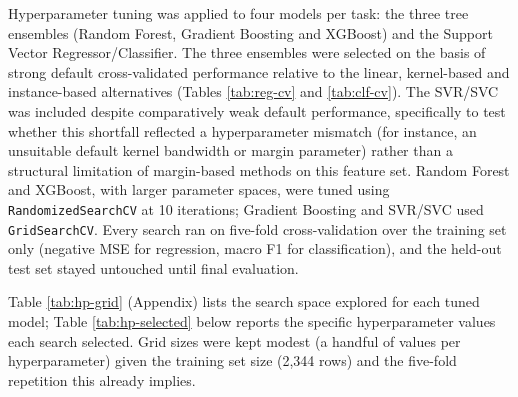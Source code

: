 \documentclass[11pt,a4paper]{article}
\begin{document}
Hyperparameter tuning was applied to four models per task: the three
tree ensembles (Random Forest, Gradient Boosting and XGBoost) and the
Support Vector Regressor/Classifier. The three ensembles were selected
on the basis of strong default cross-validated performance relative to
the linear, kernel-based and instance-based alternatives (Tables
\ref{tab:reg-cv} and \ref{tab:clf-cv}). The SVR/SVC was included despite
comparatively weak default performance, specifically to test whether
this shortfall reflected a hyperparameter mismatch (for instance, an
unsuitable default kernel bandwidth or margin parameter) rather than a
structural limitation of margin-based methods on this feature set.
Random Forest and XGBoost, with larger parameter spaces, were tuned
using \texttt{RandomizedSearchCV} at 10 iterations; Gradient Boosting
and SVR/SVC used \texttt{GridSearchCV}. Every search ran on five-fold
cross-validation over the training set only (negative MSE for
regression, macro F1 for classification), and the held-out test set
stayed untouched until final evaluation.

Table \ref{tab:hp-grid} (Appendix) lists the search space explored for
each tuned model; Table \ref{tab:hp-selected} below reports the specific
hyperparameter values each search selected. Grid sizes were kept modest
(a handful of values per hyperparameter) given the training set size
(2,344 rows) and the five-fold repetition this already implies.
\end{document}

